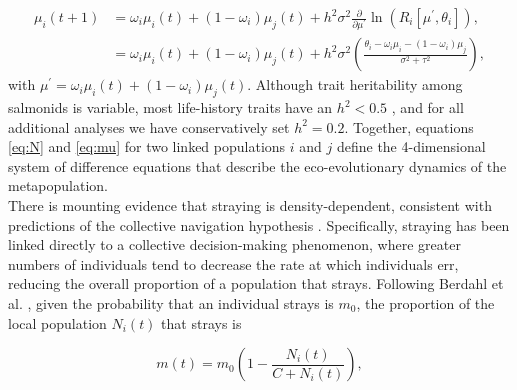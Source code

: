 \documentclass{revtex4}
\begin{document}
\begin{align}
  \label{eq:mu}
  \mu_i(t+1) &= \omega_i\mu_i(t) + (1-\omega_i)\mu_j(t) + h^2\sigma^2\frac{\partial}{\partial \mu^\prime}\ln\left(R_i[\mu^\prime,\theta_i] \right), \\ \nonumber
  &= \omega_i\mu_i(t) + (1-\omega_i)\mu_j(t) + h^2\sigma^2\left(\frac{\theta_i - \omega_i\mu_i - (1-\omega_i)\mu_j}{\sigma^2+\tau^2} \right),
\end{align}
with $\mu^\prime = \omega_i \mu_i(t)+ (1-\omega_i)\mu_j(t)$.
Although trait heritability among salmonids is variable, most life-history traits have an $h^2 < 0.5$ \citep{Carlson:2008hl}, and for all additional analyses we have conservatively set $h^2=0.2$.
Together, equations \ref{eq:N} and \ref{eq:mu} for two linked populations $i$ and $j$ define the 4-dimensional system of difference equations that describe the eco-evolutionary dynamics of the metapopulation. \\


\noindent There is mounting evidence that straying is density-dependent, consistent with predictions of the collective navigation hypothesis \citep{Berdahl:2014bl,Berdahl:2017uu}.
Specifically, straying has been linked directly to a collective decision-making phenomenon, where greater numbers of individuals tend to decrease the rate at which individuals err, reducing the overall proportion of a population that strays.
Following Berdahl et al. \citep{Berdahl:2016dx}, given the probability that an individual strays is $m_0$, the proportion of the local population $N_i(t)$ that strays is

\begin{equation}
  m(t) = m_0\left(1- \frac{N_i(t)}{C+N_i(t)}\right),
  \label{eq:ddm}
\end{equation}
\end{document}
